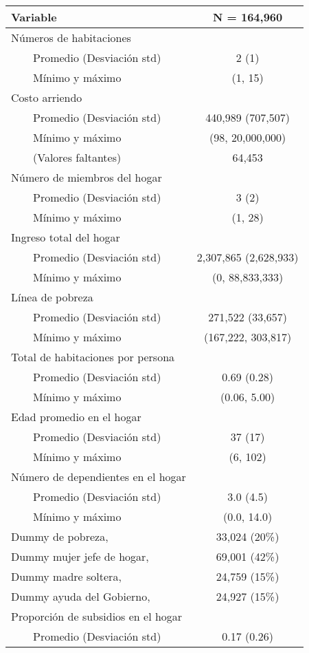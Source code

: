\begin{longtable}{lc}
\toprule
\textbf{Variable} & \textbf{N = 164,960} \\ 
\midrule
Números de habitaciones &  \\ 
    Promedio (Desviación std) & 2 (1) \\ 
    Mínimo y máximo & (1, 15) \\ 
Costo arriendo &  \\ 
    Promedio (Desviación std) & 440,989 (707,507) \\ 
    Mínimo y máximo & (98, 20,000,000) \\ 
    (Valores faltantes) & 64,453 \\ 
Número de miembros del hogar &  \\ 
    Promedio (Desviación std) & 3 (2) \\ 
    Mínimo y máximo & (1, 28) \\ 
Ingreso total del hogar &  \\ 
    Promedio (Desviación std) & 2,307,865 (2,628,933) \\ 
    Mínimo y máximo & (0, 88,833,333) \\ 
Línea de pobreza &  \\ 
    Promedio (Desviación std) & 271,522 (33,657) \\ 
    Mínimo y máximo & (167,222, 303,817) \\ 
Total de habitaciones por persona &  \\ 
    Promedio (Desviación std) & 0.69 (0.28) \\ 
    Mínimo y máximo & (0.06, 5.00) \\ 
Edad promedio en el hogar &  \\ 
    Promedio (Desviación std) & 37 (17) \\ 
    Mínimo y máximo & (6, 102) \\ 
Número de dependientes en el hogar &  \\ 
    Promedio (Desviación std) & 3.0 (4.5) \\ 
    Mínimo y máximo & (0.0, 14.0) \\ 
Dummy de pobreza,  & 33,024  (20\%) \\ 
Dummy mujer jefe de hogar,  & 69,001  (42\%) \\ 
Dummy madre soltera,  & 24,759  (15\%) \\ 
Dummy ayuda del Gobierno,  & 24,927  (15\%) \\ 
Proporción de subsidios en el hogar &  \\ 
    Promedio (Desviación std) & 0.17 (0.26) \\ 

\end{longtable}
